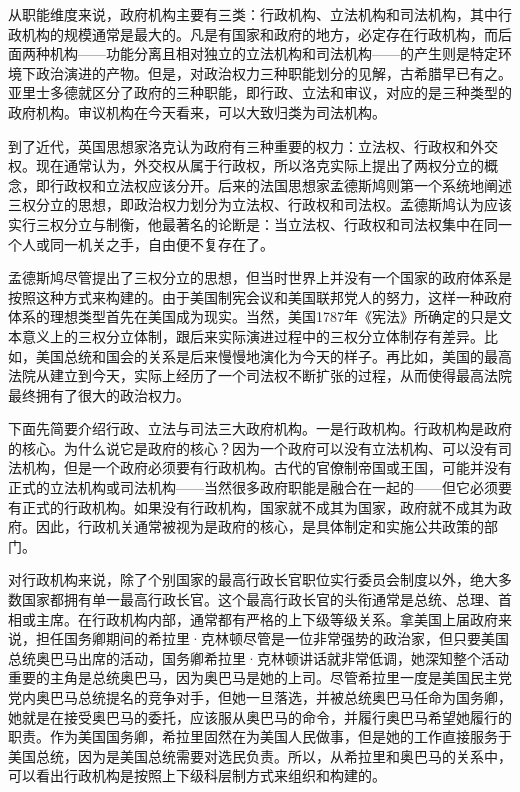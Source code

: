 从职能维度来说，政府机构主要有三类：行政机构、立法机构和司法机构，其中行政机构的规模通常是最大的。凡是有国家和政府的地方，必定存在行政机构，而后面两种机构——功能分离且相对独立的立法机构和司法机构——的产生则是特定环境下政治演进的产物。但是，对政治权力三种职能划分的见解，古希腊早已有之。亚里士多德就区分了政府的三种职能，即行政、立法和审议，对应的是三种类型的政府机构。审议机构在今天看来，可以大致归类为司法机构。

到了近代，英国思想家洛克认为政府有三种重要的权力：立法权、行政权和外交权。现在通常认为，外交权从属于行政权，所以洛克实际上提出了两权分立的概念，即行政权和立法权应该分开。后来的法国思想家孟德斯鸠则第一个系统地阐述三权分立的思想，即政治权力划分为立法权、行政权和司法权。孟德斯鸠认为应该实行三权分立与制衡，他最著名的论断是：当立法权、行政权和司法权集中在同一个人或同一机关之手，自由便不复存在了。

孟德斯鸠尽管提出了三权分立的思想，但当时世界上并没有一个国家的政府体系是按照这种方式来构建的。由于美国制宪会议和美国联邦党人的努力，这样一种政府体系的理想类型首先在美国成为现实。当然，美国1787年《宪法》所确定的只是文本意义上的三权分立体制，跟后来实际演进过程中的三权分立体制存有差异。比如，美国总统和国会的关系是后来慢慢地演化为今天的样子。再比如，美国的最高法院从建立到今天，实际上经历了一个司法权不断扩张的过程，从而使得最高法院最终拥有了很大的政治权力。

下面先简要介绍行政、立法与司法三大政府机构。一是行政机构。行政机构是政府的核心。为什么说它是政府的核心？因为一个政府可以没有立法机构、可以没有司法机构，但是一个政府必须要有行政机构。古代的官僚制帝国或王国，可能并没有正式的立法机构或司法机构——当然很多政府职能是融合在一起的——但它必须要有正式的行政机构。如果没有行政机构，国家就不成其为国家，政府就不成其为政府。因此，行政机关通常被视为是政府的核心，是具体制定和实施公共政策的部门。

对行政机构来说，除了个别国家的最高行政长官职位实行委员会制度以外，绝大多数国家都拥有单一最高行政长官。这个最高行政长官的头衔通常是总统、总理、首相或主席。在行政机构内部，通常都有严格的上下级等级关系。拿美国上届政府来说，担任国务卿期间的希拉里·克林顿尽管是一位非常强势的政治家，但只要美国总统奥巴马出席的活动，国务卿希拉里·克林顿讲话就非常低调，她深知整个活动重要的主角是总统奥巴马，因为奥巴马是她的上司。尽管希拉里一度是美国民主党党内奥巴马总统提名的竞争对手，但她一旦落选，并被总统奥巴马任命为国务卿，她就是在接受奥巴马的委托，应该服从奥巴马的命令，并履行奥巴马希望她履行的职责。作为美国国务卿，希拉里固然在为美国人民做事，但是她的工作直接服务于美国总统，因为是美国总统需要对选民负责。所以，从希拉里和奥巴马的关系中，可以看出行政机构是按照上下级科层制方式来组织和构建的。

